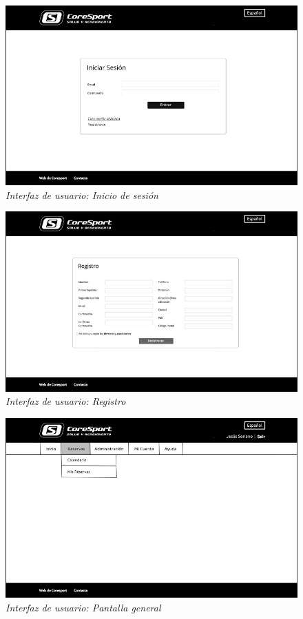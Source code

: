 \begin{figure}
\centering
  \includegraphics[scale=.40]{img/interfaz/inicio-sesion.jpg}
  \caption{\textit{Interfaz de usuario: Inicio de sesión}}
  \label{fig:interfaz-inicio-sesion}
\end{figure}

\begin{figure}
\centering
  \includegraphics[scale=.40]{img/interfaz/registro.jpg}
  \caption{\textit{Interfaz de usuario: Registro}}
  \label{fig:interfaz-registro}
\end{figure}

\begin{figure}
\centering
  \includegraphics[scale=.40]{img/interfaz/pantalla-principal.jpg}
  \caption{\textit{Interfaz de usuario: Pantalla general}}
  \label{fig:interfaz-pantalla-principal}
\end{figure}

